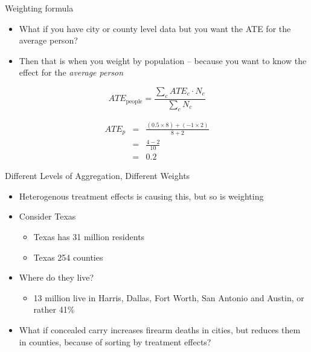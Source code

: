 \documentclass{beamer}
\begin{document}
\begin{frame}{Weighting formula}

\begin{itemize}
\item What if you have city or county level data but you want the ATE for the average person?
\item Then that is when you weight by population -- because you want to know the effect for the \emph{average person}
\end{itemize}

\begin{equation}
ATE_{\text{people}} = \frac{\sum_c ATE_c \cdot N_c}{\sum_c N_c}
\end{equation}

\begin{eqnarray*}
ATE_p &=& \frac{(0.5 \times 8) + (-1 \times 2)}{8 + 2} \\
      &=& \frac{4 - 2}{10} \\
      &=& 0.2
\end{eqnarray*}

\end{frame}




\begin{frame}{Different Levels of Aggregation, Different Weights}


\begin{itemize}
\item Heterogenous treatment effects is causing this, but so is weighting
\item Consider Texas
	\begin{itemize}
	\item Texas has 31 million residents
	\item Texas 254 counties
	\end{itemize}
\item Where do they live?
	\begin{itemize}
	\item 13 million live in Harris, Dallas, Fort Worth, San Antonio and Austin, or rather 41\%
	\end{itemize}
\item What if concealed carry increases firearm deaths in cities, but reduces them in counties, because of sorting by treatment effects?
\end{itemize}

\end{frame}
\end{document}
